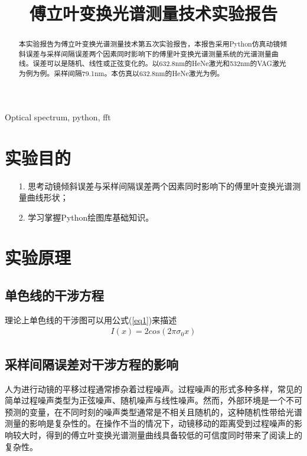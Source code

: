 \documentclass[conference]{IEEEtran}
\begin{document}
\title{傅立叶变换光谱测量技术实验报告}

\author{
}




\maketitle

\begin{abstract}
    本实验报告为傅立叶变换光谱测量技术第五次实验报告，本报告采用Python仿真动镜倾斜误差与采样间隔误差两个因素同时影响下的傅里叶变换光谱测量系统的光谱测量曲线。误差可以是随机、线性或正弦变化的。以632.8nm的HeNe激光和532nm的VAG激光为例为例。采样间隔79.1nm。本仿真以632.8nm的HeNe激光为例。
\end{abstract}

\begin{IEEEkeywords}
    Optical spectrum, python, fft
\end{IEEEkeywords}

\section{实验目的}
\begin{itemize}
    \item[1.] 思考动镜倾斜误差与采样间隔误差两个因素同时影响下的傅里叶变换光谱测量曲线形状；
    \item[2.] 学习掌握Python绘图库基础知识。 
\end{itemize} 

\section{实验原理}
\subsection{单色线的干涉方程}
理论上单色线的干涉图可以用公式(\ref{eq1})来描述
\begin{align}
    I(x) = 2cos(2\pi \sigma_0 x)    \label{eq1}
\end{align}

\subsection{采样间隔误差对干涉方程的影响}
人为进行动镜的平移过程通常掺杂着过程噪声。过程噪声的形式多种多样，常见的简单过程噪声类型为正弦噪声、随机噪声与线性噪声。然而，外部环境是一个不可预测的变量，在不同时刻的噪声类型通常是不相关且随机的，这种随机性带给光谱测量的影响是复杂性的。在操作不当的情况下，动镜移动的距离受到过程噪声的影响较大时，得到的傅立叶变换光谱测量曲线具备较低的可信度同时带来了阅读上的复杂性。
\end{document}
